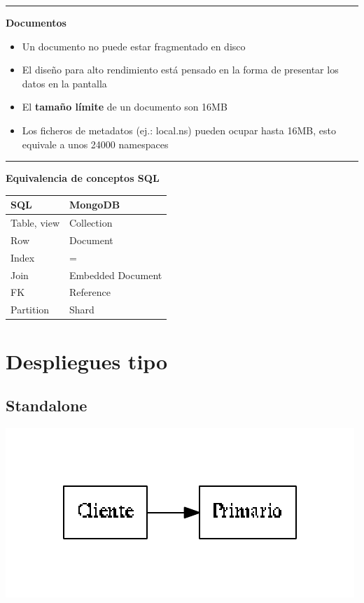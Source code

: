 \documentclass[a4paper,10pt,english]{sphinxmanual}
\begin{document}
\bigskip\hrule{}\bigskip


\textbf{Documentos}
\begin{itemize}
\item {} 
Un documento no puede estar fragmentado en disco

\item {} 
El diseño para alto rendimiento está pensado en la forma de presentar los datos en la pantalla

\item {} 
El \textbf{tamaño límite} de un documento son 16MB

\item {} 
Los ficheros de metadatos (ej.: local.ns) pueden ocupar hasta 16MB, esto equivale a unos 24000 namespaces

\end{itemize}


\bigskip\hrule{}\bigskip


\textbf{Equivalencia de conceptos SQL}

\begin{tabulary}{\linewidth}{|L|L|}
\hline
\textsf{\relax 
SQL
} & \textsf{\relax 
MongoDB
}\\
\hline
Table, view
 & 
Collection
\\

Row
 & 
Document
\\

Index
 & 
=
\\

Join
 & 
Embedded Document
\\

FK
 & 
Reference
\\

Partition
 & 
Shard
\\
\hline\end{tabulary}



\chapter{Despliegues tipo}
\label{contents/desplieguesTipo::doc}\label{contents/desplieguesTipo:despliegues-tipo}

\section{Standalone}
\label{contents/desplieguesTipo:standalone}
\includegraphics{graphviz-56fce8410a8ce23b6d99c6365600fd200eb47f9c.pdf}
\end{document}
